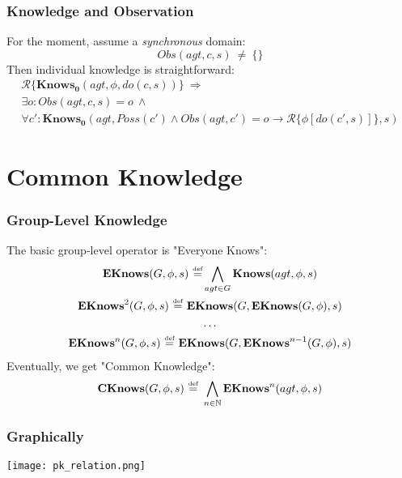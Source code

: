 \documentclass{beamer}
\newcommand{\isdef}{\hbox{$\stackrel{\mbox{\tiny def}}{=}$}}
\begin{document}
\begin{frame}
\frametitle{Knowledge and Observation}

For the moment, assume a \emph{synchronous} domain:
\begin{equation*}
Obs(agt,c,s)\ \neq\ \{\}
\end{equation*}
Then individual knowledge is straightforward:
\begin{multline*}
\mathcal{R}\{\mathbf{Knows_0}(agt,\phi,do(c,s))\}\ \Rightarrow \\
\exists o: Obs(agt,c,s)=o\ \wedge\\
\forall c': \mathbf{Knows_0}(agt,Poss(c') \wedge Obs(agt,c')=o \rightarrow \mathcal{R}\{\phi[do(c',s)]\},s)
\end{multline*}
\end{frame}

\section{Common Knowledge}
\begin{frame}
\frametitle{Group-Level Knowledge}
The basic group-level operator is "Everyone Knows":
\begin{gather*}
\mathbf{EKnows}(G,\phi,s)\ \isdef \bigwedge_{agt \in G} \mathbf{Knows}(agt,\phi,s)\\
\mathbf{EKnows}^{2}(G,\phi,s)\ \isdef\ \mathbf{EKnows}(G,\mathbf{EKnows}(G,\phi),s)\\
\dots \\
\mathbf{EKnows}^{n}(G,\phi,s)\ \isdef\ \mathbf{EKnows}(G,\mathbf{EKnows}^{n-1}(G,\phi),s)
\end{gather*}
Eventually, we get "Common Knowledge":
\begin{gather*}
\mathbf{CKnows}(G,\phi,s)\ \isdef\ \bigwedge_{n\in\mathbb{N}} \mathbf{EKnows}^{n}(agt,\phi,s)
\end{gather*}
\end{frame}

\begin{frame}
\frametitle{Graphically}
\begin{center}
  \texttt{[image: pk\_relation.png]}
\end{center}
\end{frame}
\end{document}
